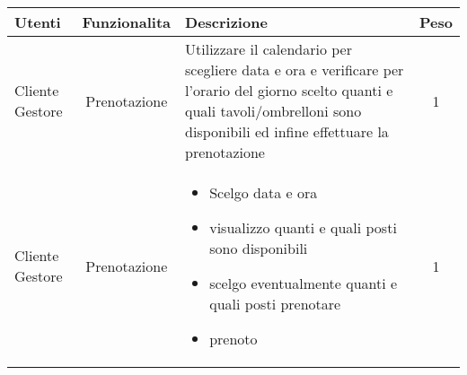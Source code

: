 \documentclass[a4paper]{article}
\begin{document}
\begin{tabularx}{\textwidth}{p{}cXc}
\toprule
Utenti & Funzionalita & Descrizione & Peso \\

\midrule
Cliente \newline Gestore & Prenotazione & Utilizzare il calendario per scegliere data e ora e verificare per l’orario del giorno scelto quanti e quali tavoli/ombrelloni
sono disponibili ed infine effettuare la prenotazione & 1\\

\midrule
Cliente \newline Gestore & Prenotazione & 
\begin{itemize}
\item Scelgo data e ora
\item visualizzo quanti e quali posti sono disponibili
\item scelgo eventualmente quanti e quali posti prenotare
\item prenoto
\end{itemize}
& 1\\
\bottomrule
\end{tabularx}
\end{document}
